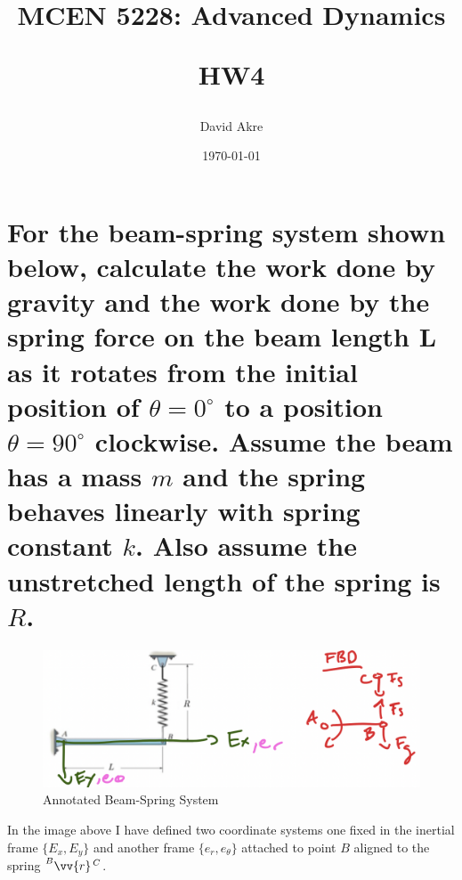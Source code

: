 \documentclass{article}
\title{MCEN 5228: Advanced Dynamics

HW4}
\author{David Akre}
\date{\today}
\begin{document}
\maketitle

\section{For the beam-spring system shown below, calculate the work done by gravity and the work done by the spring force on the beam length L as it rotates from the initial position of $\theta = 0^\circ$ to a position $\theta=90^\circ$ clockwise. Assume the beam has a mass $m$ and the spring behaves linearly with spring constant $k$. Also assume the unstretched length of the spring is $R$.}

\begin{figure}[H]
    \centering
    \includegraphics[width=0.6\linewidth]{problem1.png}
    \caption{Annotated Beam-Spring System}
\end{figure}

In the image above I have defined two coordinate systems one fixed in the inertial frame $\{E_x, E_y\}$ and another frame $\{e_r, e_{\theta}\}$ attached to point $B$ aligned to the spring  $\prescript{B}{}{\vv{r}}^{\, C}$.
\end{document}
